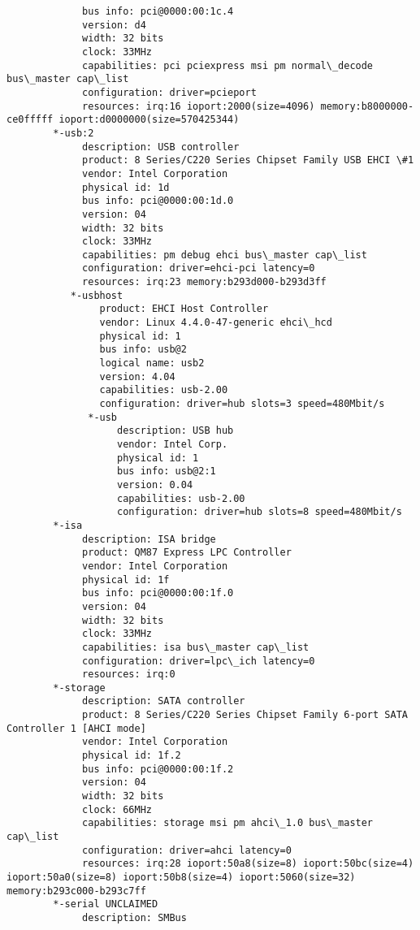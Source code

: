 \begin{verbatim}
             bus info: pci@0000:00:1c.4
             version: d4
             width: 32 bits
             clock: 33MHz
             capabilities: pci pciexpress msi pm normal\_decode bus\_master cap\_list
             configuration: driver=pcieport
             resources: irq:16 ioport:2000(size=4096) memory:b8000000-ce0fffff ioport:d0000000(size=570425344)
        *-usb:2
             description: USB controller
             product: 8 Series/C220 Series Chipset Family USB EHCI \#1
             vendor: Intel Corporation
             physical id: 1d
             bus info: pci@0000:00:1d.0
             version: 04
             width: 32 bits
             clock: 33MHz
             capabilities: pm debug ehci bus\_master cap\_list
             configuration: driver=ehci-pci latency=0
             resources: irq:23 memory:b293d000-b293d3ff
           *-usbhost
                product: EHCI Host Controller
                vendor: Linux 4.4.0-47-generic ehci\_hcd
                physical id: 1
                bus info: usb@2
                logical name: usb2
                version: 4.04
                capabilities: usb-2.00
                configuration: driver=hub slots=3 speed=480Mbit/s
              *-usb
                   description: USB hub
                   vendor: Intel Corp.
                   physical id: 1
                   bus info: usb@2:1
                   version: 0.04
                   capabilities: usb-2.00
                   configuration: driver=hub slots=8 speed=480Mbit/s
        *-isa
             description: ISA bridge
             product: QM87 Express LPC Controller
             vendor: Intel Corporation
             physical id: 1f
             bus info: pci@0000:00:1f.0
             version: 04
             width: 32 bits
             clock: 33MHz
             capabilities: isa bus\_master cap\_list
             configuration: driver=lpc\_ich latency=0
             resources: irq:0
        *-storage
             description: SATA controller
             product: 8 Series/C220 Series Chipset Family 6-port SATA Controller 1 [AHCI mode]
             vendor: Intel Corporation
             physical id: 1f.2
             bus info: pci@0000:00:1f.2
             version: 04
             width: 32 bits
             clock: 66MHz
             capabilities: storage msi pm ahci\_1.0 bus\_master cap\_list
             configuration: driver=ahci latency=0
             resources: irq:28 ioport:50a8(size=8) ioport:50bc(size=4) ioport:50a0(size=8) ioport:50b8(size=4) ioport:5060(size=32) memory:b293c000-b293c7ff
        *-serial UNCLAIMED
             description: SMBus

\end{verbatim}
